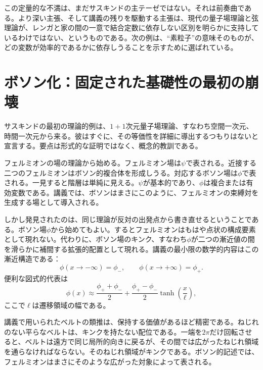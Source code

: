 この定量的な不満は、まだサスキンドの主テーゼではない。それは前奏曲である。より深い主張、そして講義の残りを駆動する主張は、現代の量子場理論と弦理論が、レンガと家の間の一意で結合定数に依存しない区別を明らかに支持しているわけではない、というものである。次の例は、``素粒子''の意味そのものが、どの変数が効率的であるかに依存しうることを示すために選ばれている。

\section{ボソン化：固定された基礎性の最初の崩壊}

サスキンドの最初の理論的例は、\(1+1\)次元量子場理論、すなわち空間一次元、時間一次元から来る。彼はすぐに、その等価性を詳細に導出するつもりはないと宣言する。要点は形式的な証明ではなく、概念的教訓である。

フェルミオンの場の理論から始める。フェルミオン場は\(\psi\)で表される。近接する二つのフェルミオンはボソン的複合体を形成しうる。対応するボソン場は\(\phi\)で表される。一見すると階層は単純に見える。\(\psi\)が基本的であり、\(\phi\)は複合または有効変数である。講義では、ボソンはまさにこのように、フェルミオンの束縛対を生成する場として導入される。

しかし発見されたのは、同じ理論が反対の出発点から書き直せるということである。ボソン場\(\phi\)から始めてもよい。するとフェルミオンはもはや点状の構成要素として現れない。代わりに、ボソン場のキンク、すなわち\(\phi\)が二つの漸近値の間を滑らかに補間する拡張的配置として現れる。講義の最小限の数学的内容はこの漸近構造である：
\begin{equation}
\phi(x\to -\infty)=\phi_-,
\qquad
\phi(x\to +\infty)=\phi_+.
\end{equation}
便利な図式的代表は
\begin{equation}
\phi(x)\approx \frac{\phi_++\phi_-}{2}
+
\frac{\phi_+-\phi_-}{2}\tanh\!\left(\frac{x}{\ell}\right),
\end{equation}
ここで\(\ell\)は遷移領域の幅である。


講義で用いられたベルトの類推は、保持する価値があるほど精密である。ねじれのない平らなベルトは、キンクを持たない配位である。一端を\(2\pi\)だけ回転させると、ベルトは遠方で同じ局所的向きに戻るが、その間では広がったねじれ領域を通らなければならない。そのねじれ領域がキンクである。ボソン的記述では、フェルミオンはまさにそのような広がった対象によって表される。

